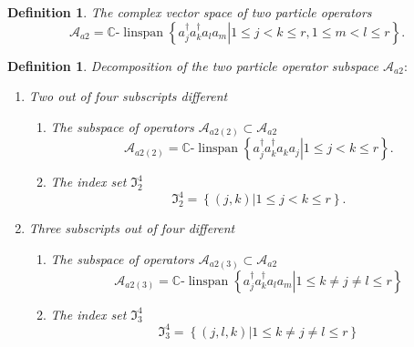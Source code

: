\documentclass[aps,preprint]{revtex4}%
\newtheorem{definition}[theorem]{Definition}
\begin{document}
\begin{definition}
The complex vector space of two particle operators
\begin{equation}
\mathcal{A}_{a2}=\mathbb{C}\text{-}\operatorname{linspan}\left\{  \left.
a_{j}^{\dagger}a_{k}^{\dagger}a_{l}a_{m}\right\vert 1\leq j<k\leq r,1\leq
m<l\leq r\right\}  .
\end{equation}

\end{definition}

\begin{definition}
Decomposition of the two particle operator subspace $\mathcal{A}_{a2}:$

\begin{enumerate}
\item Two out of four subscripts different

\begin{enumerate}
\item The subspace of operators $\mathcal{A}_{a2\left(  2\right)  }%
\subset\mathcal{A}_{a2}$
\begin{equation}
\mathcal{A}_{a2\left(  2\right)  }=\mathbb{C}\text{-}\operatorname{linspan}%
\left\{  \left.  a_{j}^{\dagger}a_{k}^{\dagger}a_{k}a_{j}\right\vert 1\leq
j<k\leq r\right\}  .
\end{equation}


\item The index set $\mathfrak{I}_{2}^{4}$
\begin{equation}
\mathfrak{I}_{2}^{4}=\left\{  \left.  \left(  j,k\right)  \right\vert 1\leq
j<k\leq r\right\}  .
\end{equation}

\end{enumerate}

\item Three subscripts out of four different

\begin{enumerate}
\item The subspace of operators $\mathcal{A}_{a2\left(  3\right)  }%
\subset\mathcal{A}_{a2}$%
\begin{equation}
\mathcal{A}_{a2\left(  3\right)  }=\mathbb{C}\text{-}\operatorname{linspan}%
\left\{  \left.  a_{j}^{\dagger}a_{k}^{\dagger}a_{l}a_{m}\right\vert 1\leq
k\neq j\neq l\leq r\right\}
\end{equation}


\item The index set $\mathfrak{I}_{3}^{4}$%
\begin{equation}
\mathfrak{I}_{3}^{4}=\left\{  \left.  \left(  j,l,k\right)  \right\vert 1\leq
k\neq j\neq l\leq r\right\}
\end{equation}


\end{enumerate}
\end{enumerate}
\end{definition}
\end{document}

